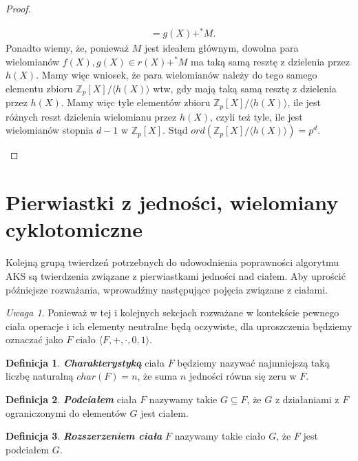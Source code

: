 \documentclass[declaration,shortabstract]{iithesis}
\theoremstyle{definition}
\newtheorem{definition}{Definicja}
\theoremstyle{remark} \newtheorem{observation}{Obserwacja}
\theoremstyle{plain} \newtheorem{theorem}{Twierdzenie}
\theoremstyle{plain} \newtheorem{lemma}{Lemat}
\theoremstyle{remark} \newtheorem*{remark*}{Uwaga}
\theoremstyle{reminder} \newtheorem*{reminder*}{Przypomnienie}
\begin{document}
\begin{proof}
\begin{enumerate}[label=Ad.\arabic*.,leftmargin=.4in]
\begin{align*}
		      	           & = g(X) +^* M.                  
		      \end{align*}
		      Ponadto wiemy, że, ponieważ $M$ jest ideałem głównym, dowolna para wielomianów $f(X), g(X) \in r(X) +^* M$ ma taką samą resztę z dzielenia przez $h(X)$. Mamy więc wniosek, że para wielomianów należy do tego samego elementu zbioru $\mathbb{Z}_p[X]/\langle h(X) \rangle$ wtw, gdy mają taką samą resztę z dzielenia przez $h(X)$.\newline
		      Mamy więc tyle elementów zbioru $\mathbb{Z}_p[X]/\langle h(X) \rangle$, ile jest różnych reszt dzielenia wielomianu przez $h(X)$, czyli też tyle, ile jest wielomianów stopnia $d-1$ w $\mathbb{Z}_p[X]$. Stąd $ord(\mathbb{Z}_p[X]/\langle h(X) \rangle) = p^d$.
	\end{enumerate}
\end{proof}

\section{Pierwiastki z jedności, wielomiany cyklotomiczne}

Kolejną grupą twierdzeń potrzebnych do udowodnienia poprawności algorytmu AKS są twierdzenia związane z pierwiastkami jedności nad ciałem. Aby uprościć późniejsze rozważania, wprowadźmy następujące pojęcia związane z ciałami.

\begin{remark*}
    Ponieważ w tej i kolejnych sekcjach rozważane w kontekście pewnego ciała operacje i ich elementy neutralne będą oczywiste, dla uproszczenia będziemy oznaczać jako $F$ ciało $\langle F, +, \cdot, 0, 1 \rangle$.    
\end{remark*}

\begin{definition}
	\textbf{\textit{Charakterystyką}} ciała $F$ będziemy nazywać najmniejszą taką liczbę naturalną $char(F) = n$, że suma $n$ jedności równa się zeru w $F$.
\end{definition}

\begin{definition}
	\textit{\textbf{Podciałem}} ciała $F$ nazywamy takie $G \subseteq F$, że $G$ z działaniami z $F$ ograniczonymi do elementów $G$ jest ciałem.
\end{definition}
	
\begin{definition}
	\textit{\textbf{Rozszerzeniem ciała}} $F$ nazywamy takie ciało $G$, że $F$ jest podciałem $G$.
\end{definition}
\end{document}
